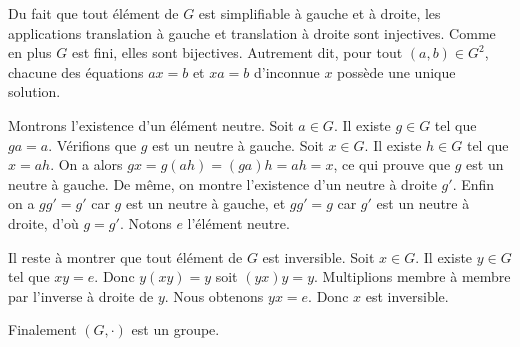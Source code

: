 Du fait que tout élément de $G$ est simplifiable à gauche et à droite, les
applications translation à gauche et translation à droite sont injectives.
Comme en plus $G$ est fini, elles sont bijectives. Autrement dit, pour tout
$(a,b)\in G^2$, chacune des équations $ax = b$ et $xa = b$ d'inconnue $x$
possède une unique solution.

Montrons l'existence d'un élément neutre. Soit $a\in G$. Il existe $g\in G$ tel
que $ga = a$. Vérifions que $g$ est un neutre à gauche. Soit $x\in G$. Il
existe $h\in G$ tel que $x = ah$. On a alors $gx = g(ah) = (ga)h = ah = x$, ce
qui prouve que $g$ est un neutre à gauche. De même, on montre l'existence
d'un neutre à droite $g'$. Enfin on a $gg' = g'$ car $g$ est un neutre à
gauche, et $gg' = g$ car $g'$ est un neutre à droite, d'où $g = g'$. Notons $e$
l'élément neutre.

Il reste à montrer que tout élément de $G$ est inversible. Soit $x\in G$. Il
existe $y\in G$ tel que $xy = e$.  Donc $y(xy) = y$ soit $(yx)y = y$.
Multiplions membre à membre par l'inverse à droite de $y$. Nous obtenons $yx =
e$. Donc $x$ est inversible. 

Finalement $(G,\cdot)$ est un groupe.
